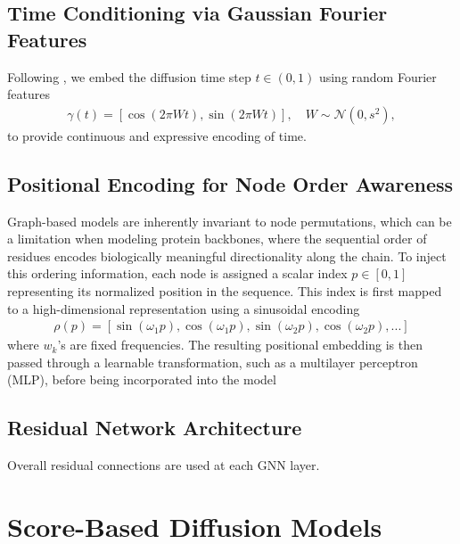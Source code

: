 \documentclass[12pt]{report}
\begin{document}
\subsection{Time Conditioning via Gaussian Fourier Features}
Following \cite{song2020score}, we embed the diffusion time step \(t\in\left(0,1\right)\) using random Fourier features \cite{tancikFourierFeaturesLet2020}
\begin{align*}
    \gamma\left(t\right)=\left[\cos\left(2\pi Wt\right),\sin\left(2\pi Wt\right)\right],\quad W\sim\mathcal{N}\left(0,s^2\right),
\end{align*}
to provide continuous and expressive encoding of time.
\subsection{Positional Encoding for Node Order Awareness}
Graph-based models are inherently invariant to node permutations, which can be a limitation when modeling protein backbones, where the sequential order of residues encodes biologically meaningful directionality along the chain. To inject this ordering information, each node is assigned a scalar index \(p\in\left[0,1\right]\) representing its normalized position in the sequence. This index is first mapped to a high-dimensional representation using a sinusoidal encoding \cite{vaswaniAttentionAllYou2017}
\begin{align*}
    \rho\left(p\right)=\left[\sin\left(\omega_1 p\right),\cos\left(\omega_1 p\right),\sin\left(\omega_2 p\right),\cos\left(\omega_2 p\right),...\right]
\end{align*}
where \(w_k\)'s are fixed frequencies. The resulting positional embedding is then passed through a learnable transformation, such as a multilayer perceptron (MLP), before being incorporated into the model
\subsection{Residual Network Architecture}
Overall residual connections are used at each GNN layer.
\section{Score-Based Diffusion Models}
\end{document}
